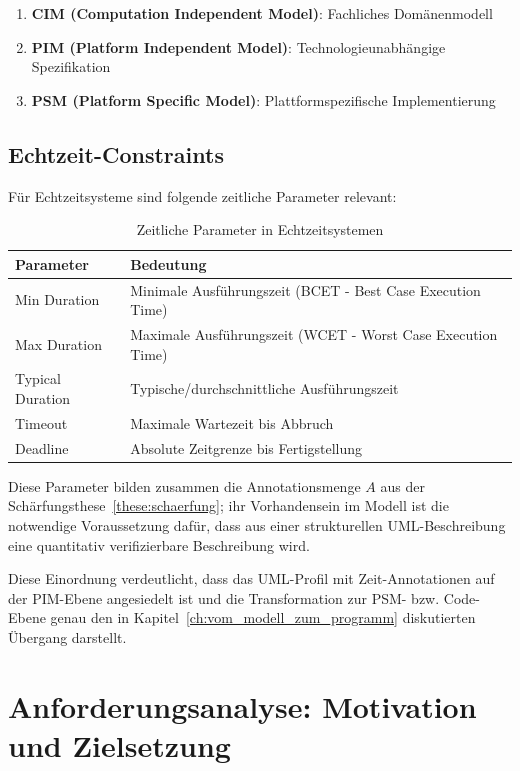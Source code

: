 ﻿\documentclass[a4paper,12pt]{report}
\theoremstyle{definition}
\begin{document}
\begin{enumerate}
	\item[-] \textbf{CIM (Computation Independent Model)}: Fachliches Domänenmodell
	\item[-] \textbf{PIM (Platform Independent Model)}: Technologieunabhängige Spezifikation
	\item[-] \textbf{PSM (Platform Specific Model)}: Plattformspezifische Implementierung
\end{enumerate}

\section{Echtzeit-Constraints}

Für Echtzeitsysteme sind folgende zeitliche Parameter relevant:

\begin{table}[H]
	\centering
	\begin{tabular}{@{}lp{8cm}@{}}
		\toprule
		\textbf{Parameter} & \textbf{Bedeutung} \\
		\midrule
		Min Duration & Minimale Ausführungszeit (BCET - Best Case Execution Time) \\
		Max Duration & Maximale Ausführungszeit (WCET - Worst Case Execution Time) \\
		Typical Duration & Typische/durchschnittliche Ausführungszeit \\
		Timeout & Maximale Wartezeit bis Abbruch \\
		Deadline & Absolute Zeitgrenze bis Fertigstellung \\
		\bottomrule
	\end{tabular}
	\caption{Zeitliche Parameter in Echtzeitsystemen}
\label{tab:zeitparameter}
	\label{tab:timing-params}
\end{table}

Diese Parameter bilden zusammen die Annotationsmenge $A$ aus der Schärfungsthese~\ref{these:schaerfung}; ihr Vorhandensein im Modell ist die notwendige Voraussetzung dafür, dass aus einer strukturellen UML-Beschreibung eine quantitativ verifizierbare Beschreibung wird.

Diese Einordnung verdeutlicht, dass das UML-Profil mit Zeit-Annotationen auf der PIM-Ebene angesiedelt ist und die Transformation zur PSM- bzw. Code-Ebene genau den in Kapitel~\ref{ch:vom_modell_zum_programm} diskutierten Übergang darstellt.

\chapter{Anforderungsanalyse: Motivation und Zielsetzung}
\end{document}
